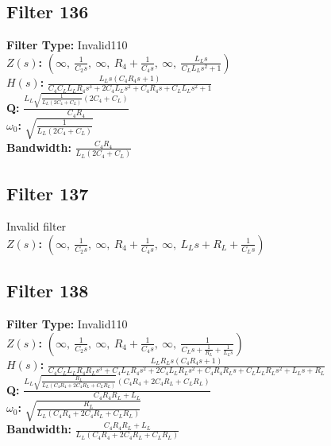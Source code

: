 \documentclass{article}
\begin{document}
\subsection*{Filter 136}
\textbf{Filter Type:} Invalid110 \\ 
\textbf{$Z(s)$:} $\left( \infty, \  \frac{1}{C_{2} s}, \  \infty, \  R_{4} + \frac{1}{C_{4} s}, \  \infty, \  \frac{L_{L} s}{C_{L} L_{L} s^{2} + 1}\right)$ \\ 
\textbf{$H(s)$:} $\frac{L_{L} s \left(C_{4} R_{4} s + 1\right)}{C_{4} C_{L} L_{L} R_{4} s^{3} + 2 C_{4} L_{L} s^{2} + C_{4} R_{4} s + C_{L} L_{L} s^{2} + 1}$ \\ 
\textbf{Q:} $\frac{L_{L} \sqrt{\frac{1}{L_{L} \left(2 C_{4} + C_{L}\right)}} \left(2 C_{4} + C_{L}\right)}{C_{4} R_{4}}$ \\ 
\textbf{$\omega_0$:} $\sqrt{\frac{1}{L_{L} \left(2 C_{4} + C_{L}\right)}}$ \\ 
\textbf{Bandwidth:} $\frac{C_{4} R_{4}}{L_{L} \left(2 C_{4} + C_{L}\right)}$ \\ 
\subsection*{Filter 137}
Invalid filter \\ 
\textbf{$Z(s)$:} $\left( \infty, \  \frac{1}{C_{2} s}, \  \infty, \  R_{4} + \frac{1}{C_{4} s}, \  \infty, \  L_{L} s + R_{L} + \frac{1}{C_{L} s}\right)$ \\ 
\subsection*{Filter 138}
\textbf{Filter Type:} Invalid110 \\ 
\textbf{$Z(s)$:} $\left( \infty, \  \frac{1}{C_{2} s}, \  \infty, \  R_{4} + \frac{1}{C_{4} s}, \  \infty, \  \frac{1}{C_{L} s + \frac{1}{R_{L}} + \frac{1}{L_{L} s}}\right)$ \\ 
\textbf{$H(s)$:} $\frac{L_{L} R_{L} s \left(C_{4} R_{4} s + 1\right)}{C_{4} C_{L} L_{L} R_{4} R_{L} s^{3} + C_{4} L_{L} R_{4} s^{2} + 2 C_{4} L_{L} R_{L} s^{2} + C_{4} R_{4} R_{L} s + C_{L} L_{L} R_{L} s^{2} + L_{L} s + R_{L}}$ \\ 
\textbf{Q:} $\frac{L_{L} \sqrt{\frac{R_{L}}{L_{L} \left(C_{4} R_{4} + 2 C_{4} R_{L} + C_{L} R_{L}\right)}} \left(C_{4} R_{4} + 2 C_{4} R_{L} + C_{L} R_{L}\right)}{C_{4} R_{4} R_{L} + L_{L}}$ \\ 
\textbf{$\omega_0$:} $\sqrt{\frac{R_{L}}{L_{L} \left(C_{4} R_{4} + 2 C_{4} R_{L} + C_{L} R_{L}\right)}}$ \\ 
\textbf{Bandwidth:} $\frac{C_{4} R_{4} R_{L} + L_{L}}{L_{L} \left(C_{4} R_{4} + 2 C_{4} R_{L} + C_{L} R_{L}\right)}$ \\ 
\end{document}
